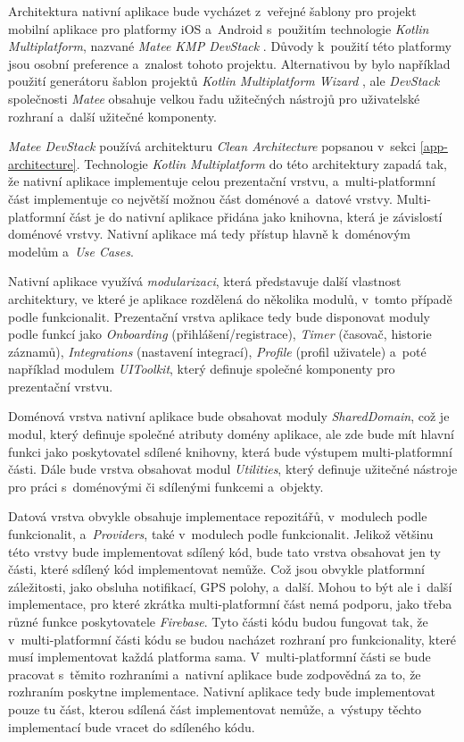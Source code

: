 Architektura nativní aplikace bude vycházet z~veřejné šablony pro projekt mobilní aplikace pro platformy iOS a~Android s~použitím technologie \emph{Kotlin Multiplatform}, nazvané \emph{Matee KMP DevStack} \cite{matee-devstack}. Důvody k~použití této platformy jsou osobní preference a~znalost tohoto projektu. Alternativou by bylo například použití generátoru šablon projektů \emph{Kotlin Multiplatform Wizard} \cite{kmp-wizard}, ale \emph{DevStack} společnosti \emph{Matee} obsahuje velkou řadu užitečných nástrojů pro uživatelské rozhraní a~další užitečné komponenty.

\emph{Matee DevStack} používá architekturu \emph{Clean Architecture} popsanou v~sekci \ref{app-architecture}. Technologie \emph{Kotlin Multiplatform} do této architektury zapadá tak, že nativní aplikace implementuje celou prezentační vrstvu, a~multi-platformní část implementuje co největší možnou část doménové a~datové vrstvy. Multi-platformní část je do nativní aplikace přidána jako knihovna, která je závislostí doménové vrstvy. Nativní aplikace má tedy přístup hlavně k~doménovým modelům a~\emph{Use Cases}.

Nativní aplikace využívá \emph{modularizaci}, která představuje další vlastnost architektury, ve které je aplikace rozdělená do několika modulů, v~tomto případě podle funkcionalit. Prezentační vrstva aplikace tedy bude disponovat moduly podle funkcí jako \emph{Onboarding} (přihlášení/registrace), \emph{Timer} (časovač, historie záznamů), \emph{Integrations} (nastavení integrací), \emph{Profile} (profil uživatele) a~poté například modulem \emph{UIToolkit}, který definuje společné komponenty pro prezentační vrstvu.

Doménová vrstva nativní aplikace bude obsahovat moduly \emph{SharedDomain}, což je modul, který definuje společné atributy domény aplikace, ale zde bude mít hlavní funkci jako poskytovatel sdílené knihovny, která bude výstupem multi-platformní části. Dále bude vrstva obsahovat modul \emph{Utilities}, který definuje užitečné nástroje pro práci s~doménovými či sdílenými funkcemi a~objekty.

Datová vrstva obvykle obsahuje implementace repozitářů, v~modulech podle funkcionalit, a~\emph{Providers}, také v~modulech podle funkcionalit. Jelikož většinu této vrstvy bude implementovat sdílený kód, bude tato vrstva obsahovat jen ty části, které sdílený kód implementovat nemůže. Což jsou obvykle platformní záležitosti, jako obsluha notifikací, GPS polohy, a~další. Mohou to být ale i~další implementace, pro které zkrátka multi-platformní část nemá podporu, jako třeba různé funkce poskytovatele \emph{Firebase}. Tyto části kódu budou fungovat tak, že v~multi-platformní části kódu se budou nacházet rozhraní pro funkcionality, které musí implementovat každá platforma sama. V~multi-platformní části se bude pracovat s~těmito rozhraními a~nativní aplikace bude zodpovědná za to, že rozhraním poskytne implementace. Nativní aplikace tedy bude implementovat pouze tu část, kterou sdílená část implementovat nemůže, a~výstupy těchto implementací bude vracet do sdíleného kódu.

